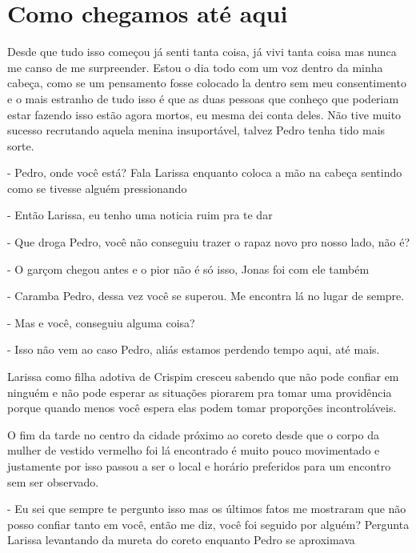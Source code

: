 
\chapter{Como chegamos até aqui}



Desde que tudo isso começou já senti tanta coisa, já vivi tanta coisa mas nunca me canso de me surpreender. Estou o dia todo com um voz dentro da minha cabeça, como se um pensamento fosse colocado la dentro sem meu consentimento e o mais estranho de tudo isso é que as duas pessoas que conheço que poderiam estar fazendo isso estão agora mortos, eu mesma dei conta deles. Não tive muito sucesso recrutando aquela menina insuportável, talvez Pedro tenha tido mais sorte.

- Pedro, onde você está? Fala Larissa enquanto coloca a mão na cabeça sentindo como se tivesse alguém pressionando

- Então Larissa, eu tenho uma noticia ruim pra te dar

- Que droga Pedro, você não conseguiu trazer o rapaz novo pro nosso lado, não é?

- O garçom chegou antes e o pior não é só isso, Jonas foi com ele também

- Caramba Pedro, dessa vez você se superou. Me encontra lá no lugar de sempre.

- Mas e você, conseguiu alguma coisa?

- Isso não vem ao caso Pedro, aliás estamos perdendo tempo aqui, até mais.

Larissa como filha adotiva de Crispim cresceu sabendo que não pode confiar em ninguém e não pode esperar as situações piorarem pra tomar uma providência porque quando menos você espera elas podem tomar proporções incontroláveis.

O fim da tarde no centro da cidade próximo ao coreto desde que o corpo da mulher de vestido vermelho foi lá encontrado é muito pouco movimentado e justamente por isso passou a ser o local e horário preferidos para um encontro sem ser observado.

- Eu sei que sempre te pergunto isso mas os últimos fatos me mostraram que não posso confiar tanto em você, então me diz, você foi seguido por alguém? Pergunta Larissa levantando da mureta do coreto enquanto Pedro se aproximava

